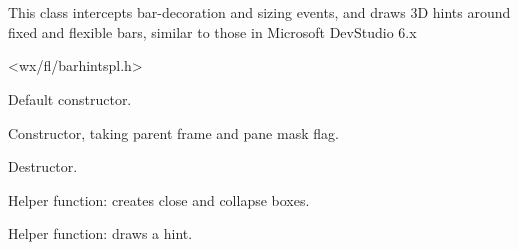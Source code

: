 %
%


\section{}\label{cbbarhintsplugin}


This class intercepts bar-decoration and sizing events, and draws 3D hints
around fixed and flexible bars, similar to those in Microsoft DevStudio 6.x




<wx/fl/barhintspl.h>




\label{cbbarhintsplugincbbarhintsplugin}


Default constructor.



Constructor, taking parent frame and pane mask flag.


\label{cbbarhintsplugindtor}


Destructor.


\label{cbbarhintsplugincreateboxes}


Helper function: creates close and collapse boxes.


\label{cbbarhintsplugindodrawhint}


Helper function: draws a hint.


\label{cbbarhintsplugindraw3dbox}

